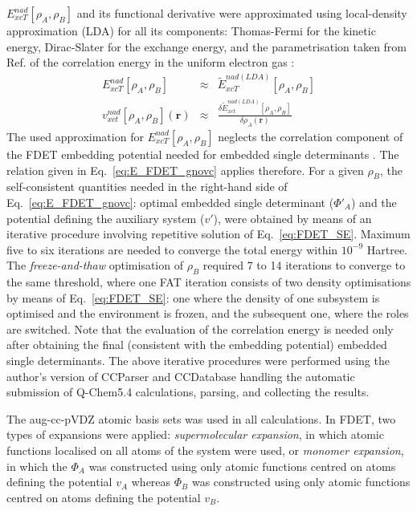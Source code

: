 \documentclass[amsmath,amssymb,preprint,aip,jcp]{revtex4-1}
\begin{document}
$E_{xcT}^{nad}[\rho_A,\rho_B]$ and its functional derivative were approximated using local-density approximation (LDA) for all its components: Thomas-Fermi \cite{Thomas1927, Fermi1928} for the kinetic energy, Dirac-Slater\cite{Slater1929} for the exchange energy, 
and the parametrisation taken from Ref.  of the correlation energy in the uniform electron gas  \cite{Ceperley1980}:
\begin{eqnarray}
{E}_{xcT}^{nad}[\rho_A,\rho_B]&\approx& \tilde {E}_{xcT}^{nad(LDA)}[\rho_A,\rho_B] \\
v_{xct}^{nad}[\rho_A,\rho_B](\mathbf{r})&\approx&\frac{\delta \tilde{E}_{xct}^{nad(LDA)}[\rho_A,\rho_B]}{\delta\rho_A(\mathbf{r})}
\end{eqnarray}
The used approximation for ${E}_{xcT}^{nad}[\rho_A,\rho_B]$ neglects the correlation component of the FDET embedding potential needed for embedded single determinants \cite{Wesolowski2008}.   The relation given in Eq.~\ref{eq:E_FDET_gnovc} applies therefore. 
For a given $\rho_B$, the self-consistent quantities needed in the right-hand side of Eq.~\ref{eq:E_FDET_gnovc}: 
optimal embedded single determinant ($\Phi'_A$) and the potential defining the auxiliary system ($v'$), 
were obtained by means of an iterative procedure involving repetitive solution of Eq.~\ref{eq:FDET_SE}. 
Maximum five to six iterations are needed to converge the total energy within $10^{-9}$ Hartree. 
The \textit{freeze-and-thaw} optimisation of $\rho_B$ required 7 to 14 iterations to converge to the same threshold, where one FAT iteration consists of two density optimisations by means of Eq.~\ref{eq:FDET_SE}: one where the density of one subsystem is optimised and the environment is frozen, and the subsequent one, where the roles are switched. 
Note that the evaluation of the correlation energy is needed only after obtaining the final (consistent with the embedding potential) embedded single determinants. 
The above iterative procedures
were performed using the author's version \cite{CCParser_Ricardi} of CCParser\cite{CCParser_Zech} and CCDatabase\cite{CCDatabase} handling the automatic submission of Q-Chem5.4\cite{Qchem54} calculations, parsing, and collecting the results.

The aug-cc-pVDZ atomic basis sets was used in all calculations. 
In FDET, two types of expansions were applied: {\it supermolecular expansion}, in which atomic functions localised on all atoms of the system were used, or {\it monomer expansion}, in which the $\Phi_A$ was constructed using only 
atomic functions centred on atoms defining the potential $v_A$ whereas $\Phi_B$ was constructed using only atomic functions centred on atoms defining the potential $v_B$.
\end{document}
